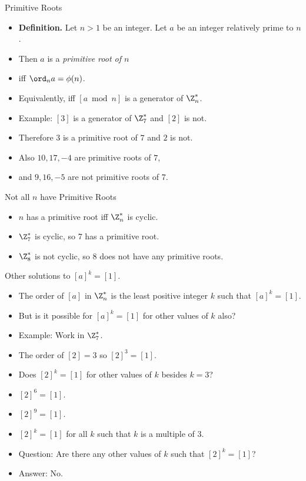 \documentclass{beamer}
\begin{document}
\begin{frame}{Primitive Roots}

\begin{itemize}
  \item \textbf{Definition.} Let $n>1$ be an integer. Let $a$ be an integer relatively prime to $n$.
  \item Then $a$ is a \emph{primitive root of $n$}
  \item iff $\ord_n a = \phi(n)$.
  \item Equivalently, iff $[a \bmod n]$ is a generator of $\Z_n^*$.
  \item Example: $[3]$ is a generator of $\Z_7^*$ and $[2]$ is not.
  \item Therefore $3$ is a primitive root of $7$ and $2$ is not.
  \item Also $10, 17, -4$ are primitive roots of $7$,
  \item and $9, 16, -5$ are not primitive roots of $7$.
\end{itemize}

\end{frame}

\begin{frame}{Not all $n$ have Primitive Roots}

\begin{itemize}
  \item $n$ has a primitive root iff $\Z_n^*$ is cyclic.
  \item $\Z_7^*$ is cyclic, so $7$ has a primitive root.
  \item $\Z_8^*$ is not cyclic, so $8$ does not have any primitive roots.
\end{itemize}

\end{frame}

\begin{frame}{Other solutions to $[a]^k = [1]$.}

\begin{itemize}
  \item The order of $[a]$ in $\Z_n^*$ is the least positive integer $k$ such that
  $[a]^k = [1]$.
  \item But is it possible for $[a]^k = [1]$ for other values of $k$ also?
  \item Example: Work in $\Z_7^*$.
  \item The order of $[2] = 3$ so $[2]^3 = [1]$.
  \item Does $[2]^k = [1]$ for other values of $k$ besides $k=3$?
  \item $[2]^6 = [1]$.
  \item $[2]^9 = [1]$.
  \item $[2]^k = [1]$ for all $k$ such that $k$ is a multiple of 3.
  \item Question: Are there any other values of $k$ such that $[2]^k = [1]$?
  \item Answer: No.
\end{itemize}
\end{frame}
\end{document}
